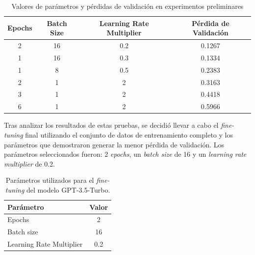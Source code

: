 \vspace{0.5cm}
\begin{table}[H]
\centering
\begin{tabular}{|c|c|c|c|}
\hline
\textbf{Epochs} & \textbf{Batch Size} & \textbf{Learning Rate Multiplier} & \textbf{Pérdida de Validación} \\ \hline
2               & 16                  & 0.2                             & 0.1267                          \\ \hline
1               & 16                  & 0.3                            & 0.1334                          \\ \hline
1              & 8                  & 0.5                            & 0.2383                          \\ \hline
2              & 1                  & 2                             & 0.3163                          \\ \hline
3              & 1                  & 2                             & 0.4418                          \\ \hline
6              & 1                  & 2                             & 0.5966                          \\ \hline
\end{tabular}
\caption{Valores de parámetros y pérdidas de validación en experimentos preliminares}
\label{tab:hyperparam-tuning}
\end{table}

Tras analizar los resultados de estas pruebas, se decidió llevar a cabo el \textit{fine-tuning} final utilizando el conjunto de datos de entrenamiento completo y los parámetros que demostraron generar la menor pérdida de validación. Los parámetros seleccionados fueron: 2 \textit{epochs}, un \textit{batch size} de 16 y un \textit{learning rate multiplier} de 0.2.

\vspace{0.5cm}
\begin{table}[H]
\centering
\begin{tabular}{|l|c|}
\hline
\textbf{Parámetro} & \textbf{Valor} \\
\hline
Epochs & 2 \\
\hline
Batch size & 16 \\
\hline
Learning Rate Multiplier & 0.2 \\
\hline
\end{tabular}
\caption{Parámetros utilizados para el \textit{fine-tuning} del modelo GPT-3.5-Turbo.}
\label{tab:params-fine-tuning}
\end{table}

